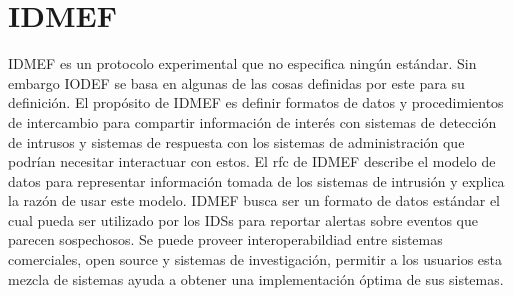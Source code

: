 \section{IDMEF}
IDMEF es un protocolo experimental que no especifica ningún estándar. Sin 
embargo IODEF se basa en algunas de las cosas definidas por este para su 
definición. El propósito de IDMEF es definir formatos de datos y procedimientos 
de intercambio para compartir información de interés con sistemas de detección 
de intrusos y sistemas de respuesta con los sistemas de administración que 
podrían necesitar interactuar con estos.
El rfc de IDMEF describe el modelo de datos para representar información tomada 
de los sistemas de intrusión y explica la razón de usar este modelo.
IDMEF busca ser un formato de datos estándar el cual pueda ser utilizado por los 
IDSs para reportar alertas sobre eventos que parecen sospechosos. Se puede 
proveer interoperabildiad entre sistemas comerciales, open source y sistemas de 
investigación, permitir a los usuarios esta mezcla de sistemas ayuda a obtener 
una implementación óptima de sus sistemas.

